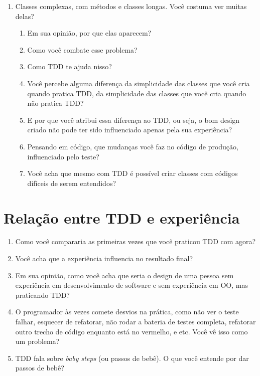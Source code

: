 \begin{enumerate}
	\item{Classes complexas, com métodos e classes longas. Você
	costuma ver muitas delas?}
		\begin{enumerate}
			\item Em sua opinião, por que elas aparecem?

			\item Como você combate esse problema?

			\item Como TDD te ajuda nisso?
			
			\item Você percebe alguma diferença da simplicidade das classes que você cria quando
			pratica TDD, da simplicidade das classes que você cria quando não pratica TDD?
			
			\item E por que você atribui essa diferença ao TDD, ou seja, o bom design
			criado não pode ter sido influenciado apenas pela sua experiência?
			
			\item Pensando em código, que mudanças você faz no código de produção, influenciado
			pelo teste?

			\item Você acha que mesmo com TDD é possível criar classes com códigos difíceis de serem entendidos? 

		\end{enumerate}
\end{enumerate}

\section{Relação entre TDD e experiência}
\label{entrevista:experiencia}

\begin{enumerate}
	\item Como você compararia as primeiras vezes que você praticou TDD com agora?

	\item Você acha que a experiência influencia no resultado final?

	\item Em sua opinião, como você acha que seria o design de uma pessoa sem
	experiência em desenvolvimento de software e sem experiência em OO, mas praticando TDD?

	\item O programador às vezes comete desvios na prática, como não ver o teste
	falhar,  esquecer de refatorar, não rodar a bateria de testes completa,
	refatorar outro trecho de código enquanto está no vermelho, e etc. Você vê isso
	como um problema?
	
	\item TDD fala sobre \textit{baby steps} (ou passos de bebê). O que você 
	entende por dar passos de bebê?

\end{enumerate}

